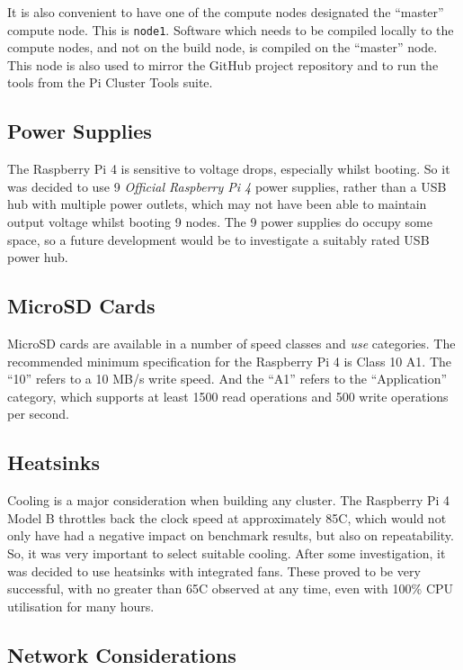 It is also convenient to have one of the compute nodes designated the ``master'' compute node. This is \verb|node1|. Software which needs to be compiled locally to the compute nodes, and not on the build node, is compiled on the ``master'' node. This node is also used to mirror the GitHub project repository and to run the tools from the Pi Cluster Tools suite. 


%
%
\subsection{Power Supplies}
The Raspberry Pi 4 is sensitive to voltage drops, especially whilst booting. So it was decided to use 9 \emph{Official Raspberry Pi 4} power supplies, rather than a USB hub with multiple power outlets, which may not have been able to maintain output voltage whilst booting 9 nodes. The 9 power supplies do occupy some space, so a future development would be to investigate a suitably rated USB power hub.


%
%
\subsection{MicroSD Cards}
MicroSD cards are available in a number of speed classes and \emph{use} categories. The recommended minimum specification for the Raspberry Pi 4 is Class 10 A1. The ``10'' refers to a 10 MB/s write speed. And the ``A1'' refers to the ``Application'' category, which supports at least 1500 read operations and 500 write operations per second.


%
%
\subsection{Heatsinks}
Cooling is a major consideration when building any cluster. The Raspberry Pi 4 Model B throttles back the clock speed at approximately 85\degree C, which would not only have had a negative impact on benchmark results, but also on repeatability. So, it was very important to select suitable cooling. After some investigation, it was decided to use heatsinks with integrated fans. These proved to be very successful, with no greater than 65\degree C observed at any time, even with 100\% CPU utilisation for many hours. 


%
%
\subsection{Network Considerations}

